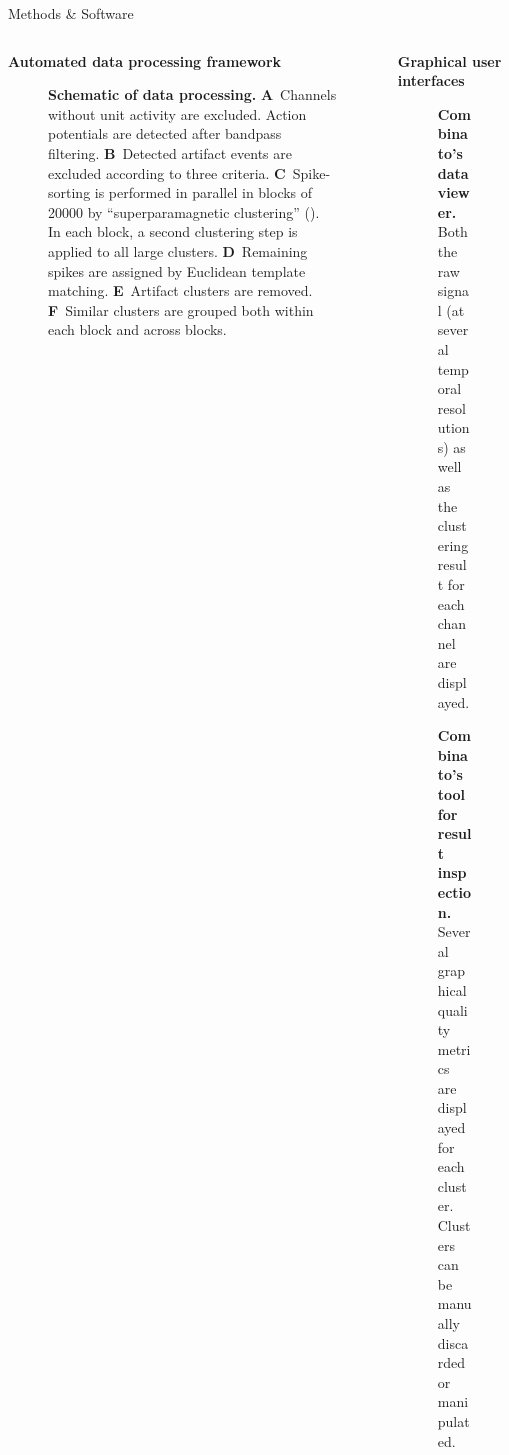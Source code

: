 \documentclass{beamer}
\renewcommand{\emph}{\textbf}
\begin{document}
\begin{frame}[t]
\begin{columns}[T]
\begin{column}{.49\linewidth} %
\begin{block}{Methods \& Software}
  \begin{columns}[T]
    \begin{column}{.48\linewidth}
      \emph{Automated data processing framework}
      \vspace{-1em}
  \begin{figure}
    \caption{\textbf{Schematic of data processing.} \textbf{A}~Channels without unit activity are excluded. Action potentials are detected after bandpass filtering. \textbf{B}~Detected artifact events are excluded according to three criteria. \textbf{C}~Spike-sorting is performed in parallel in blocks of \num{20000} by ``superparamagnetic clustering'' (\cite{quian_quiroga_unsupervised_2004}). In each block, a second clustering step is  applied to all large clusters. \textbf{D}~Remaining spikes are assigned by Euclidean template matching. \textbf{E}~Artifact clusters are removed. \textbf{F}~Similar clusters are grouped both within each block and across blocks. }
  \end{figure}
\end{column}
\begin{column}{.42\linewidth}
  \emph{Graphical user interfaces}
  \vspace{-1em}
  \begin{figure}
\caption{\emph{Combinato's data viewer.} Both the raw signal (at several temporal resolutions) as well as the clustering result for each channel are displayed.}
\end{figure}
\vspace{-1.9em}
\begin{figure}
\caption{\emph{Combinato's tool for result inspection.} Several graphical quality metrics are displayed for each cluster. Clusters can be manually discarded or manipulated.}
\end{figure}
\vspace{-2em}
\end{column}
\end{columns}

\end{block}


\end{column}
\end{columns}
\end{frame}
\end{document}
